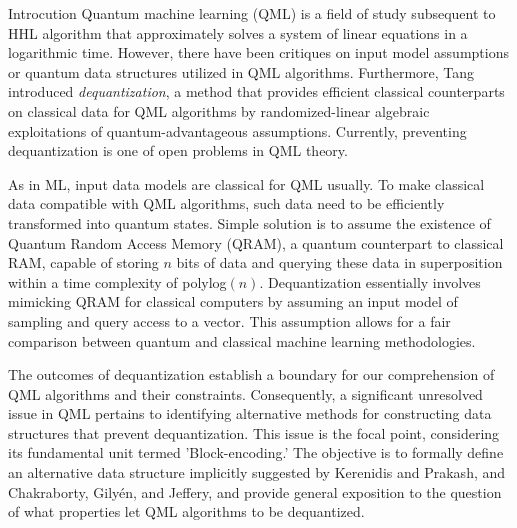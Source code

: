 \documentclass[10pt,twoside,reqno]{amsart} %
\makeatletter
\renewcommand{\section}{\@startsection{section}{1}
   \z@{.7\linespacing\@plus\linespacing}{.5\linespacing}
   {\normalfont\upshape\bfseries\centering}}
\theoremstyle{plain}
\theoremstyle{definition}
\makeatother
\begin{document}
\bigskip
\section{Introcution}
Quantum machine learning (QML) is a field of study subsequent
to HHL algorithm \cite{harrow2009} that approximately solves a system of linear
equations in a logarithmic time. However, there have been critiques 
\cite{aaronson2015} on input model assumptions or quantum data structures
utilized in QML algorithms. Furthermore, Tang \cite{tang2019} introduced 
\emph{dequantization}, a method that provides efficient classical counterparts
on classical data for QML algorithms by randomized-linear algebraic exploitations
of quantum-advantageous assumptions. Currently, preventing dequantization
is one of open problems \cite{tang2023} in QML theory.


As in ML, input data models are classical for QML usually. To make classical
data compatible with QML algorithms, such data need to be efficiently transformed
into quantum states. Simple solution is to assume the existence of Quantum 
Random Access Memory (QRAM), a quantum counterpart to classical RAM, capable of
storing $n$ bits of data and querying these data in superposition within a time
complexity of polylog$(n)$. Dequantization essentially involves
mimicking QRAM for classical computers by assuming an input model of sampling
and query access to a vector. This assumption allows for a fair comparison
between quantum and classical machine learning methodologies.

The outcomes of dequantization establish a boundary for our comprehension of QML
algorithms and their constraints. Consequently, a significant unresolved issue
in QML pertains to identifying alternative methods for constructing data 
structures that prevent dequantization. This issue is the focal point, 
considering its fundamental unit termed 'Block-encoding.' The objective is to
formally define an alternative data structure implicitly suggested by Kerenidis
and Prakash, and Chakraborty, Gilyén, and Jeffery, and provide general exposition
to the question of what properties let QML algorithms to be dequantized.
\end{document}
